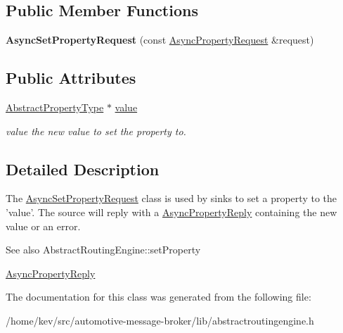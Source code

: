 \subsection*{Public Member Functions}
\begin{DoxyCompactItemize}
\item 
\hypertarget{classAsyncSetPropertyRequest_aa2fa61c815aa1950511eb88cc29f655a}{{\bfseries Async\+Set\+Property\+Request} (const \hyperlink{classAsyncPropertyRequest}{Async\+Property\+Request} \&request)}\label{classAsyncSetPropertyRequest_aa2fa61c815aa1950511eb88cc29f655a}

\end{DoxyCompactItemize}
\subsection*{Public Attributes}
\begin{DoxyCompactItemize}
\item 
\hypertarget{classAsyncSetPropertyRequest_a5c1c8d5b4a6765ce2acab9a3aca9c9a6}{\hyperlink{classAbstractPropertyType}{Abstract\+Property\+Type} $\ast$ \hyperlink{classAsyncSetPropertyRequest_a5c1c8d5b4a6765ce2acab9a3aca9c9a6}{value}}\label{classAsyncSetPropertyRequest_a5c1c8d5b4a6765ce2acab9a3aca9c9a6}

\begin{DoxyCompactList}\small\item\em value the new value to set the property to. \end{DoxyCompactList}\end{DoxyCompactItemize}


\subsection{Detailed Description}
The \hyperlink{classAsyncSetPropertyRequest}{Async\+Set\+Property\+Request} class is used by sinks to set a property to the 'value'. The source will reply with a \hyperlink{classAsyncPropertyReply}{Async\+Property\+Reply} containing the new value or an error. 

\begin{DoxySeeAlso}{See also}
Abstract\+Routing\+Engine\+::set\+Property 

\hyperlink{classAsyncPropertyReply}{Async\+Property\+Reply} 
\end{DoxySeeAlso}


The documentation for this class was generated from the following file\+:\begin{DoxyCompactItemize}
\item 
/home/kev/src/automotive-\/message-\/broker/lib/abstractroutingengine.\+h\end{DoxyCompactItemize}
